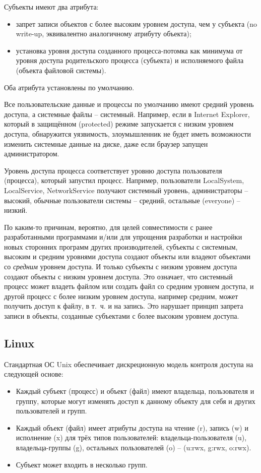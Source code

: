 Субъекты имеют два атрибута:
\begin{itemize}
    \item запрет записи объектов с более высоким уровнем доступа, чем у субъекта (no write-up, эквивалентно аналогичному атрибуту объекта);
    \item установка уровня доступа созданного процесса-потомка как минимума от уровня доступа родительского процесса (субъекта) и исполняемого файла (объекта файловой системы).
\end{itemize}
Оба атрибута установлены по умолчанию.

Все пользовательские данные и процессы по умолчанию имеют средний уровень доступа, а системные файлы -- системный. Например, если в Internet Explorer, который в защищённом (protected) режиме запускается с низким уровнем доступа, обнаружится уязвимость, злоумышленник не будет иметь возможности изменить системные данные на диске, даже если браузер запущен администратором.

Уровень доступа процесса соответствует уровню доступа пользователя (процесса), который запустил процесс. Например, пользователи LocalSystem, LocalService, NetworkService получают системный уровень, администраторы -- высокий, обычные пользователи системы -- средний, остальные (everyone) -- низкий.

По каким-то причинам, вероятно, для целей совместимости с ранее разработанными программами и/или для упрощения разработки и настройки новых сторонних программ других производителей, субъекты с системным, высоким и средним уровнями доступа создают объекты или владеют объектами со \emph{средним} уровнем доступа. И только субъекты с низким уровнем доступа создают объекты с низким уровнем доступа. Это означает, что системный процесс может владеть файлом или создать файл со средним уровнем доступа, и другой процесс с более низким уровнем доступа, например средним, может получить доступ к файлу, в т.~ч. и на запись. Это нарушает принцип запрета записи в объекты, созданные субъектами с более высоким уровнем доступа.


\subsection{Linux}

Стандартная ОС Unix обеспечивает дискреционную модель контроля доступа на следующей основе:
\begin{itemize}
    \item Каждый субъект (процесс) и объект (файл) имеют владельца, пользователя и группу, которые могут изменять доступ к данному объекту для себя и других пользователей и групп.
    \item Каждый объект (файл) имеет атрибуты доступа на чтение (r), запись (w) и исполнение (x) для трёх типов пользователей: владельца-пользователя (u), владельца-группы (g), остальных пользователей (o) -- (u:rwx, g:rwx, o:rwx).
    \item Субъект может входить в несколько групп.
\end{itemize}

